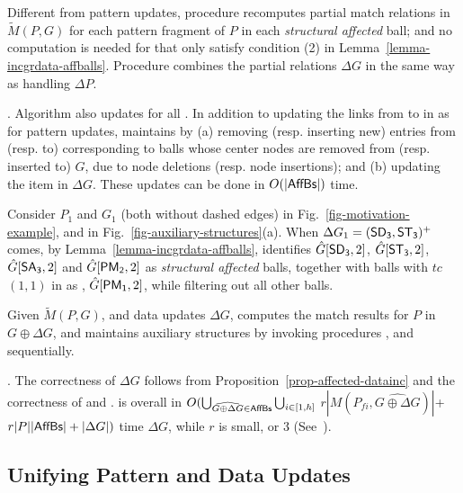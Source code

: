 Different from pattern updates, procedure \incmatch recomputes partial match relations in $\tilde{M}(P,G)$
for each pattern fragment of $P$ in each {\em structural affected} ball;
and no computation is needed for \affballsx that only satisfy condition (2) in Lemma~\ref{lemma-incgrdata-affballs}.
Procedure \comb combines the partial relations \wrt $\Delta G$ in the same way as handling $\Delta P$.


. Algorithm \incd also updates \fb for all \affballsx.
In addition to updating the links from \fs to \bs in \fb as for pattern updates,
\incd maintains \bs by
(a) removing (resp. inserting new) entries from (resp. to) \bs corresponding to balls whose center nodes are removed from (resp. inserted to) $G$, due to node deletions (resp. node insertions);
and (b) updating the  item in \bs \wrt $\Delta G$.
These updates can be done in $O(|{\mathsf{AffBs}}|)$ time.


\begin{example}
\label{exa-Ginc}
Consider $P_1$ and $G_1$ (both without dashed edges) in Fig.~\ref{fig-motivation-example}, and \fb in Fig.~\ref{fig-auxiliary-structures}(a).
When $\Delta G_1=({\mathsf{SD_3}},{\mathsf{ST_3}})^+$ comes,
by Lemma~\ref{lemma-incgrdata-affballs},
\identifyaffball identifies $\hat{G}{[{\mathsf{SD_3}}, 2]}$, $\hat{G}{[{\mathsf{ST_3}},2]}$, $\hat{G}{[{\mathsf{SA_3}}, 2]}$ and $\hat{G}{[{\mathsf{PM_2}}, 2]}$ as {\em structural affected} balls,
together with balls with $tc$ $(1, 1)$ in \fb as \affballsx, \ie $\hat{G}{[{\mathsf{PM_1}}, 2]}$, while filtering out all other balls.
\end{example}


 Given $\tilde{M}(P,G)$, \fb and data updates $\Delta G$,
\incd computes the match results for $P$ in $G \oplus \Delta G$, and maintains
auxiliary structures by invoking procedures \identifyaffball, \incmatch and \comb sequentially.


. The correctness of \incd \wrt $\Delta G$ follows from Proposition~\ref{prop-affected-datainc} and the correctness of \incmatch and \comb.
\incd is overall in
$O(\bigcup_{\widehat{G\oplus\Delta G}\in {\ensuremath {\mathsf{AffBs}}}}\bigcup_{i\in[1,h]}$ $r|M(P_{fi}, \widehat{G\oplus\Delta G})|$+$r|P||{\mathsf{AffBs}}| + |\Delta G|)$ time \wrt $\Delta G$, while $r$ is small,  or 3  (See~\cite{fullvldb18}).



\subsection{Unifying Pattern and Data Updates}
\label{subsec-completePG}

